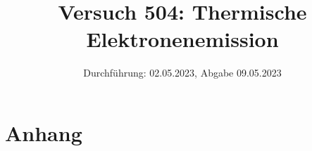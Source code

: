 

\title{Versuch 504: Thermische Elektronenemission}
\date{Durchführung: 02.05.2023, Abgabe 09.05.2023}


\maketitle
\thispagestyle{empty} 
\tableofcontents
\newpage
\setcounter{page}{1}






\printbibliography
\newpage

\section*{Anhang}

